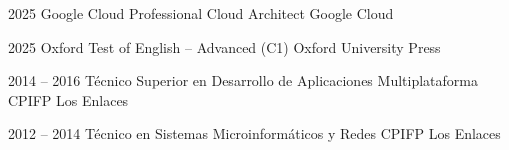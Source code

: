 \documentclass[9pt]{developercv} %
\begin{document}

%

\begin{entrylist}
	\shortentry
		{2025}
		{Google Cloud Professional Cloud Architect}
		{Google Cloud}
		{}

	\shortentry
		{2025}
		{Oxford Test of English -- Advanced (C1)}
		{Oxford University Press}
		{}
\end{entrylist}



\begin{entrylist}
	\shortentry
		{2014 -- 2016}
		{Técnico Superior en Desarrollo de Aplicaciones Multiplataforma}
		{CPIFP Los Enlaces}
		{}

	\shortentry
		{2012 -- 2014}
		{Técnico en Sistemas Microinformáticos y Redes}
		{CPIFP Los Enlaces}
		{}
\end{entrylist}

\end{document}
